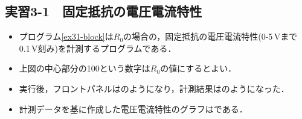 \clearpage
\subsection{実習3-1　固定抵抗の電圧電流特性}
\begin{itemize}
	\item プログラム\ref{ex31-block}は$R_{0}$の場合の，固定抵抗の電圧電流特性(0-5\,\rm{V}まで0.1\,\rm{V}刻み)を計測するプログラムである．
	\item 上図の中心部分の100という数字は$R_{0}$の値にするとよい．
	\item 実行後，フロントパネルはのようになり，計測結果はのようになった．
	\item 計測データを基に作成した電圧電流特性のグラフはである．
\end{itemize}

